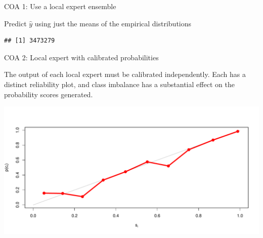 \documentclass[ignorenonframetext,]{beamer}
\newenvironment{Shaded}{\begin{snugshade}}{\end{snugshade}}
\newcommand{\KeywordTok}[1]{\textcolor[rgb]{0.13,0.29,0.53}{\textbf{{#1}}}}
\newcommand{\StringTok}[1]{\textcolor[rgb]{0.31,0.60,0.02}{{#1}}}
\newcommand{\NormalTok}[1]{{#1}}
\begin{document}
\begin{frame}[fragile]{COA 1: Use a local expert ensemble}

Predict \(\hat{y}\) using just the means of the empirical distributions

\footnotesize

\begin{Shaded}
\end{Shaded}

\begin{verbatim}
## [1] 3473279
\end{verbatim}

\end{frame}

\begin{frame}{COA 2: Local expert with calibrated probabilities}

The output of each local expert must be calibrated independently. Each
has a distinct reliability plot, and class imbalance has a substantial
effect on the probability scores generated.

\includegraphics{presentation_files/figure-beamer/unnamed-chunk-18-1.pdf}

\end{frame}
\end{document}
